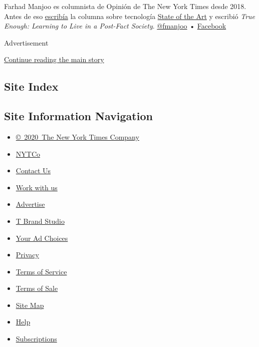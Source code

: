 Farhad Manjoo es columnista de Opinión de The New York Times desde 2018.
Antes de eso
\href{https://www.nytimes.com/2019/07/10/opinion/pronoun-they-gender.html}{escribía}
la columna sobre tecnología
\href{https://www.nytimes.com/column/state-of-the-art}{State of the Art}
y escribió \emph{True Enough: Learning to Live in a Post-Fact Society}.
\href{https://twitter.com/fmanjoo}{@fmanjoo} •
\href{https://www.facebook.com/farhad.manjoo}{Facebook}

Advertisement

\protect\hyperlink{after-bottom}{Continue reading the main story}

\hypertarget{site-index}{%
\subsection{Site Index}\label{site-index}}

\hypertarget{site-information-navigation}{%
\subsection{Site Information
Navigation}\label{site-information-navigation}}

\begin{itemize}
\tightlist
\item
  \href{https://help.nytimes.com/hc/en-us/articles/115014792127-Copyright-notice}{©~2020~The
  New York Times Company}
\end{itemize}

\begin{itemize}
\tightlist
\item
  \href{https://www.nytco.com/}{NYTCo}
\item
  \href{https://help.nytimes.com/hc/en-us/articles/115015385887-Contact-Us}{Contact
  Us}
\item
  \href{https://www.nytco.com/careers/}{Work with us}
\item
  \href{https://nytmediakit.com/}{Advertise}
\item
  \href{http://www.tbrandstudio.com/}{T Brand Studio}
\item
  \href{https://www.nytimes.com/privacy/cookie-policy\#how-do-i-manage-trackers}{Your
  Ad Choices}
\item
  \href{https://www.nytimes.com/privacy}{Privacy}
\item
  \href{https://help.nytimes.com/hc/en-us/articles/115014893428-Terms-of-service}{Terms
  of Service}
\item
  \href{https://help.nytimes.com/hc/en-us/articles/115014893968-Terms-of-sale}{Terms
  of Sale}
\item
  \href{https://spiderbites.nytimes.com}{Site Map}
\item
  \href{https://help.nytimes.com/hc/en-us}{Help}
\item
  \href{https://www.nytimes.com/subscription?campaignId=37WXW}{Subscriptions}
\end{itemize}
